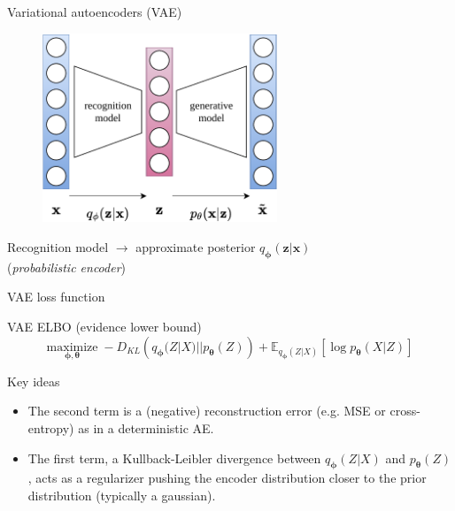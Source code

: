 \documentclass[handout]{beamer}
\begin{document}
  \begin{frame}{Variational autoencoders (VAE)}

    \begin{figure}
      \includegraphics[width=7cm]{rc/vae}
    \end{figure}

    Recognition model $\rightarrow$ \alert{approximate posterior} $q_{\boldsymbol{\phi}}(\mathbf{z}|\mathbf{x})$\\
    (\emph{probabilistic encoder})

  \end{frame}

  \begin{frame}{VAE loss function}

    
    \begin{exampleblock}{VAE ELBO (evidence lower bound)}
      \vspace{-0.25cm}
      \begin{equation*}
        \underset{\boldsymbol{\phi},\boldsymbol{\theta}}{\text{maximize}} \; -D_{KL}\left(q_{\boldsymbol{\phi}}(Z|X)||p_{\boldsymbol{\theta}}(Z)\right) + \mathbb{E}_{q_{\boldsymbol{\phi}}(Z|X)}\left[\log p_{\boldsymbol{\theta}}(X|Z)\right]
      \end{equation*}
    \end{exampleblock}
    \pause
    \begin{alertblock}{Key ideas}
      \begin{itemize}
        \item The second term is a (negative) \alert{reconstruction error} (e.g. MSE or cross-entropy) as in a deterministic AE.
        \item The first term, a Kullback-Leibler divergence between $q_{\boldsymbol{\phi}}(Z|X)$ and $p_{\boldsymbol{\theta}}(Z)$, acts as a \alert{regularizer} pushing the encoder distribution closer to the prior distribution (typically a gaussian).
      \end{itemize}
    \end{alertblock}

  \end{frame}
\end{document}
